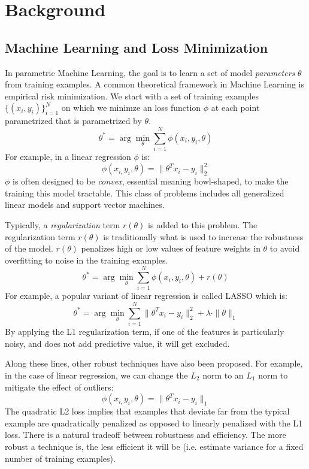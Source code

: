 \section{Background}
\subsection{Machine Learning and Loss Minimization}
In parametric Machine Learning, the goal is to learn a set of model \emph{parameters} $\theta$ from training examples.
A common theoretical framework in Machine Learning is empirical risk minimization.
We start with a set of training examples $\{(x_{i},y_{i})\}_{i=1}^{N}$
on which we minimze an loss function $\phi$ at each point parametrized that is parametrized by $\theta$.
\[
 \theta^{*}=\arg\min_{\theta}\sum_{i=1}^{N}\phi(x_{i},y_{i},\theta)
\]
For example, in a linear regression $\phi$ is:
\[
\phi(x_{i,}y_{i},\theta) = \|\theta^Tx_{i} - y_i \|_2^2
\]
$\phi$ is often designed to be \emph{convex}, essential meaning bowl-shaped, to make the training this model 
tractable.
This class of problems includes all generalized linear models and support vector machines.

Typically, a \emph{regularization} term $r(\theta)$ is added to this problem.
The regularization term $r(\theta)$ is traditionally what is used to increase the robustness of the model.
$r(\theta)$ penalizes high or low values of feature weights in $\theta$ to avoid overfitting to noise in the
training examples.
\[
 \theta^{*}=\arg\min_{\theta}\sum_{i=1}^{N}\phi(x_{i},y_{i},\theta) + r(\theta)
\]
For example, a popular variant of linear regression is called LASSO which is:
\[
 \theta^{*}=\arg\min_{\theta}\sum_{i=1}^{N}\|\theta^Tx_{i} - y_i \|_2^2 + \lambda \cdot \|\theta\|_1
\]
By applying the L1 regularization term, if one of the features is particularly noisy, and does not add predictive value, it will get excluded.

Along these lines, other robust techniques have also been proposed.
For example, in the case of linear regression, we can change the $L_2$ norm to an $L_1$ norm to mitigate the effect of outliers:
\[
\phi(x_{i,}y_{i},\theta) = \|\theta^Tx_{i} - y_i \|_1
\]
The quadratic L2 loss implies that examples that deviate far from the typical example are quadratically penalized as opposed to linearly penalized with the L1 loss.
There is a natural tradeoff between robustness and efficiency.
The more robust a technique is, the less efficient it will be (i.e. estimate variance for a fixed number of training examples).

